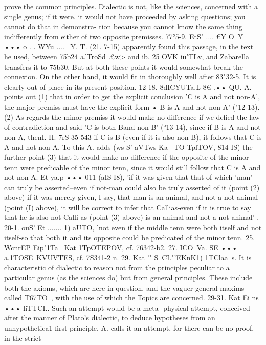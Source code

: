 {{{{{{{{{{{{prove the common principles. Dialectic is not, like the sciences,
concerned with a single genus; if it were, it would not have
proceeded by asking questions; you cannot do that in demonstra-
tion because you cannot know the same thing indifferently from
either of two opposite premisses.
77°5-9. EtS" .... €Y O~Y ••• o . . WYu .... ~Y. T. (21. 7-15) apparently
found this passage, in the text he used, between 75b24 a.'TroSd~£w>
and ib. 25 OVK iu'TLv, and Zabarella transfers it to 75b30. But at
both these points it would somewhat break the connexion. On
the other hand, it would fit in thoroughly well after 83"32-5.
It is clearly out of place in its present position.
12-18. 8dICYUTa.L 8€ .•• QU. A. points out (1) that in order to
get the explicit conclusion 'C is A and not non-A', the major
premiss must have the explicit form • B is A and not non-A'
("12-13). (2) As regards the minor premiss it would make no
difference if we defied the law of contradiction and said 'C is
both Band non-B' (°13-14), since if B is A and not non-A, thenI. II. 7rS-35
543
if C is B (even if it is also non-B), it follows that C is A and not
non-A. To this A. adds (ws S' aVTws Ka~ TO TplTOV, 814-IS) the
further point (3) that it would make no difference if the opposite
of the minor tenn were predicable of the minor tenn, since it
would still follow that C is A and not non-A.
Et ya.p ••• 011 (aIS-I8), 'if it was given that that of which 'man'
can truly be asserted--even if not-man could also be truly
asserted of it (point (2) above)-if it was merely given, I say, that
man is an animal, and not a not-animal (point (I) above), it
will be correct to infer that Callias-even if it is true to say that
he is also not-Calli as (point (3) above)-is an animal and not a
not-animal' .
20-1. ouS' Et ....... 1) aUTO, 'not even if the middle tenn were
both itself and not itself-so that both it and its opposite could
be predicated of the minor tenn.
25. WcnrEP Eip"1Ta~ Kat 1TpOTEPOV, cf. 76342-b2.
27. ICO~Va. SE ••• a.1TOSE~KVUVTES, cf. 7S341-2 n.
29. Kat '" S~CI."'EKnK1) 1TClaa~s. It is characteristic of dialectic
to reason not from the principles peculiar to a particular genus
(as the sciences do) but from general principles. These include
both the axioms, which are here in question, and the vaguer
general maxims called T67TO~, with the use of which the Topics
are concerned.
29-31. Kat Ei ns ••• liTTCI.. Such an attempt would be a meta-
physical attempt, conceived after the manner of Plato's dialectic,
to deduce hypotheses from an unhypothetica1 first principle.
A. calls it an attempt, for there can be no proof, in the strict
}}}}}}}}}}}}
